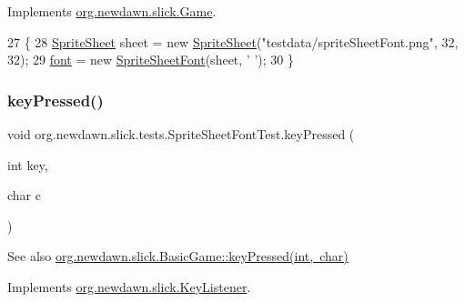 Implements \mbox{\hyperlink{interfaceorg_1_1newdawn_1_1slick_1_1_game_ad2dd6affab08bb8fdb5fab0815957b7a}{org.\+newdawn.\+slick.\+Game}}.


\begin{DoxyCode}
27                                                                    \{
28       \mbox{\hyperlink{classorg_1_1newdawn_1_1slick_1_1_sprite_sheet}{SpriteSheet}} sheet = \textcolor{keyword}{new} \mbox{\hyperlink{classorg_1_1newdawn_1_1slick_1_1_sprite_sheet}{SpriteSheet}}(\textcolor{stringliteral}{"testdata/spriteSheetFont.png"}, 32, 32);
29       \mbox{\hyperlink{classorg_1_1newdawn_1_1slick_1_1tests_1_1_sprite_sheet_font_test_a910b79c0adb99fde6f3122070d2a9dfa}{font}} = \textcolor{keyword}{new} \mbox{\hyperlink{classorg_1_1newdawn_1_1slick_1_1_sprite_sheet_font}{SpriteSheetFont}}(sheet, \textcolor{charliteral}{' '});
30    \}
\end{DoxyCode}
\mbox{\label{classorg_1_1newdawn_1_1slick_1_1tests_1_1_sprite_sheet_font_test_a3466f33cbc843894f9974697fd988e74}} 
\subsubsection{\texorpdfstring{key\+Pressed()}{keyPressed()}}
{\footnotesize\ttfamily void org.\+newdawn.\+slick.\+tests.\+Sprite\+Sheet\+Font\+Test.\+key\+Pressed (\begin{DoxyParamCaption}\item[{int}]{key,  }\item[{char}]{c }\end{DoxyParamCaption})\hspace{0.3cm}{\ttfamily [inline]}}

\begin{DoxySeeAlso}{See also}
\mbox{\hyperlink{classorg_1_1newdawn_1_1slick_1_1_basic_game_a4fbb3345b5abf5ddd54a99466d07f02f}{org.\+newdawn.\+slick.\+Basic\+Game\+::key\+Pressed(int, char)}} 
\end{DoxySeeAlso}


Implements \mbox{\hyperlink{interfaceorg_1_1newdawn_1_1slick_1_1_key_listener_ac0b0568a21ef486c4f51382614c196ef}{org.\+newdawn.\+slick.\+Key\+Listener}}.


